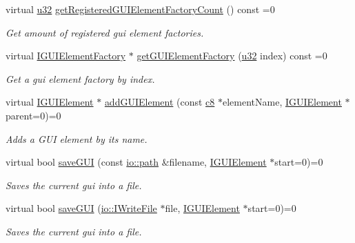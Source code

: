 \begin{DoxyCompactItemize}
virtual \hyperlink{namespaceirr_a0416a53257075833e7002efd0a18e804}{u32} \hyperlink{classirr_1_1gui_1_1IGUIEnvironment_a022dcd144b1f955180569ef2ee844561}{get\+Registered\+G\+U\+I\+Element\+Factory\+Count} () const =0
\begin{DoxyCompactList}\small\item\em Get amount of registered gui element factories. \end{DoxyCompactList}\item 
virtual \hyperlink{classirr_1_1gui_1_1IGUIElementFactory}{I\+G\+U\+I\+Element\+Factory} $\ast$ \hyperlink{classirr_1_1gui_1_1IGUIEnvironment_a3c1ec1c13e7339e2e8abb34276d6288f}{get\+G\+U\+I\+Element\+Factory} (\hyperlink{namespaceirr_a0416a53257075833e7002efd0a18e804}{u32} index) const =0
\begin{DoxyCompactList}\small\item\em Get a gui element factory by index. \end{DoxyCompactList}\item 
virtual \hyperlink{classirr_1_1gui_1_1IGUIElement}{I\+G\+U\+I\+Element} $\ast$ \hyperlink{classirr_1_1gui_1_1IGUIEnvironment_a17114e35fc67f6d54df1baebb806f3b7}{add\+G\+U\+I\+Element} (const \hyperlink{namespaceirr_a9395eaea339bcb546b319e9c96bf7410}{c8} $\ast$element\+Name, \hyperlink{classirr_1_1gui_1_1IGUIElement}{I\+G\+U\+I\+Element} $\ast$parent=0)=0
\begin{DoxyCompactList}\small\item\em Adds a G\+UI element by its name. \end{DoxyCompactList}\item 
virtual bool \hyperlink{classirr_1_1gui_1_1IGUIEnvironment_ac5e7b39ff2292983660a5e5999b240b3}{save\+G\+UI} (const \hyperlink{namespaceirr_1_1io_ab1bdc45edb3f94d8319c02bc0f840ee1}{io\+::path} \&filename, \hyperlink{classirr_1_1gui_1_1IGUIElement}{I\+G\+U\+I\+Element} $\ast$start=0)=0
\begin{DoxyCompactList}\small\item\em Saves the current gui into a file. \end{DoxyCompactList}\item 
virtual bool \hyperlink{classirr_1_1gui_1_1IGUIEnvironment_a39fdeef8455813a2be2bce9212ec758a}{save\+G\+UI} (\hyperlink{classirr_1_1io_1_1IWriteFile}{io\+::\+I\+Write\+File} $\ast$file, \hyperlink{classirr_1_1gui_1_1IGUIElement}{I\+G\+U\+I\+Element} $\ast$start=0)=0
\begin{DoxyCompactList}\small\item\em Saves the current gui into a file. \end{DoxyCompactList}\item 

\end{DoxyCompactItemize}
